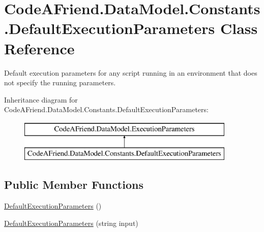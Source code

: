\hypertarget{class_code_a_friend_1_1_data_model_1_1_constants_1_1_default_execution_parameters}{}\section{Code\+A\+Friend.\+Data\+Model.\+Constants.\+Default\+Execution\+Parameters Class Reference}
\label{class_code_a_friend_1_1_data_model_1_1_constants_1_1_default_execution_parameters}


Default execution parameters for any script running in an environment that does not specify the running parameters.  


Inheritance diagram for Code\+A\+Friend.\+Data\+Model.\+Constants.\+Default\+Execution\+Parameters\+:\begin{figure}[H]
\begin{center}
\leavevmode
\includegraphics[height=2.000000cm]{class_code_a_friend_1_1_data_model_1_1_constants_1_1_default_execution_parameters}
\end{center}
\end{figure}
\subsection*{Public Member Functions}
\begin{DoxyCompactItemize}
\item 
\mbox{\hyperlink{class_code_a_friend_1_1_data_model_1_1_constants_1_1_default_execution_parameters_a5c8afe78939f6ba8052a2c0ccde9b4dc}{Default\+Execution\+Parameters}} ()
\item 
\mbox{\hyperlink{class_code_a_friend_1_1_data_model_1_1_constants_1_1_default_execution_parameters_a4e4c0663bfc96511b9d1d917c30804d3}{Default\+Execution\+Parameters}} (string input)
\end{DoxyCompactItemize}
